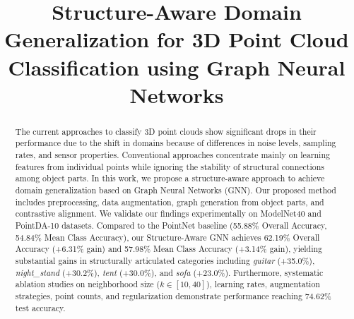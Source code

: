\documentclass[conference]{IEEEtran}
\begin{document}
\title{Structure-Aware Domain Generalization for 3D Point Cloud Classification using Graph Neural Networks}

\author{
\and
{}
\and
{}
\and
{}
}

\maketitle

\begin{abstract}
The current approaches to classify 3D point clouds show significant drops in their performance due to the shift in domains because of differences in noise levels, sampling rates, and sensor properties. Conventional approaches concentrate mainly on learning features from individual points while ignoring the stability of structural connections among object parts. In this work, we propose a structure-aware approach to achieve domain generalization based on Graph Neural Networks (GNN). Our proposed method includes preprocessing, data augmentation, graph generation from object parts, and contrastive alignment. We validate our findings experimentally on ModelNet40 and PointDA-10 datasets. Compared to the PointNet baseline (55.88\% Overall Accuracy, 54.84\% Mean Class Accuracy), our Structure-Aware GNN achieves 62.19\% Overall Accuracy (+6.31\% gain) and 57.98\% Mean Class Accuracy (+3.14\% gain), yielding substantial gains in structurally articulated categories including \textit{guitar} (+35.0\%), \textit{night\_stand} (+30.2\%), \textit{tent} (+30.0\%), and \textit{sofa} (+23.0\%). Furthermore, systematic ablation studies on neighborhood size ($k \in [10, 40]$), learning rates, augmentation strategies, point counts, and regularization demonstrate performance reaching 74.62\% test accuracy.
\end{abstract}
\end{document}
